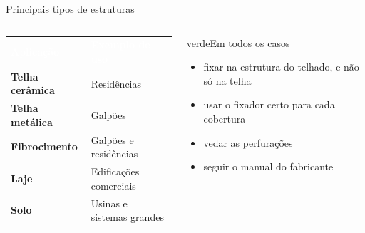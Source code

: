\documentclass[aspectratio=169,10pt,xcolor=table]{beamer}
\newcommand{\cabecalho}{\rowcolor{azul}}
\newcommand{\tcab}[1]{\textcolor{white}{\bfseries #1}}
\begin{document}
\begin{frame}{Principais tipos de estruturas}
  \begin{columns}[c]
    \begin{column}{0.5\textwidth}
      \small
      \renewcommand{\arraystretch}{1.6}
      \begin{tabular}{>{\bfseries}L{2.6cm} L{3.6cm}}
        \cabecalho \tcab{Aplicação} & \tcab{Exemplo de uso}\\
        Telha cerâmica & Residências\\
        Telha metálica & Galpões\\
        Fibrocimento & Galpões e residências\\
        Laje & Edificações comerciais\\
        Solo & Usinas e sistemas grandes\\
      \end{tabular}
    \end{column}
    \begin{column}{0.44\textwidth}
      \begin{card}{verde}{\faCheckCircle\enspace Em todos os casos}
        \begin{itemize}
          \item fixar na estrutura do telhado, e não só na telha
          \item usar o fixador certo para cada cobertura
          \item vedar as perfurações
          \item seguir o manual do fabricante
        \end{itemize}
      \end{card}
    \end{column}
  \end{columns}
\end{frame}
\end{document}
